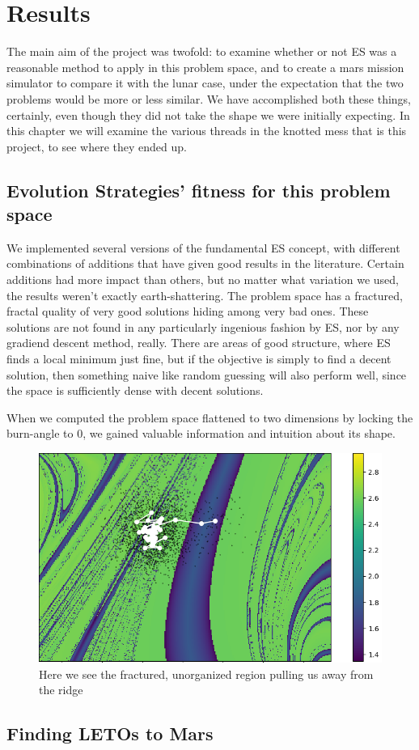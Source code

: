 
\chapter{Results}
The main aim of the project was twofold: to examine whether or not ES was a reasonable method to apply in this problem space, and to create a mars mission simulator to compare it with the lunar case, under the expectation that the two problems would be more or less similar. We have accomplished both these things, certainly, even though they did not take the shape we were initially expecting. In this chapter we will examine the various threads in the knotted mess that is this project, to see where they ended up.

\section{Evolution Strategies' fitness for this problem space}
We implemented several versions of the fundamental ES concept, with different combinations of additions that have given good results in the literature. Certain additions had more impact than others, but no matter what variation we used, the results weren't exactly earth-shattering. The problem space has a fractured, fractal quality of very good solutions hiding among very bad ones. These solutions are not found in any particularly ingenious fashion by ES, nor by any gradiend descent method, really. There are areas of good structure, where ES finds a local minimum just fine, but if the objective is simply to find a decent solution, then something naive like random guessing will also perform well, since the space is sufficiently dense with decent solutions. 

When we computed the problem space flattened to two dimensions by locking the burn-angle to 0, we gained valuable information and intuition about its shape. 

\begin{figure}[h]
    \includegraphics{fig/inESdivergingfromridge.png}
    \caption{Here we see the fractured, unorganized region pulling us away from the ridge}
    \label{fig:esdivergingfromridge}
\end{figure}



\section{Finding LETOs to Mars}

